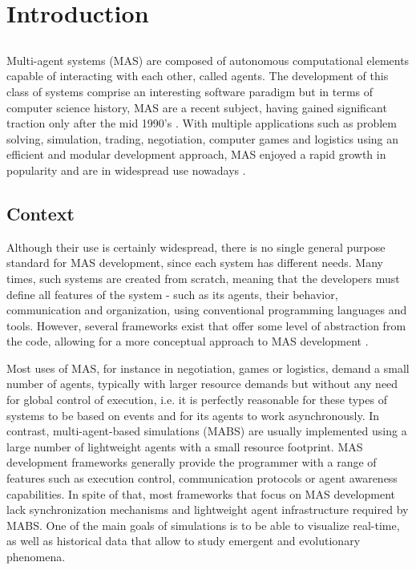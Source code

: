 \chapter{Introduction}
\label{chap:intro}

\section*{}

Multi-agent systems (MAS) are composed of autonomous computational elements capable of interacting with each other, called agents. The development of this class of systems comprise an interesting software paradigm but in terms of computer science history, MAS are a recent subject, having gained significant traction only after the mid 1990's \cite{wooldridge2008introduction}. With multiple applications such as problem solving, simulation, trading, negotiation, computer games and logistics using an efficient and modular development approach, MAS enjoyed a rapid growth in popularity and are in widespread use nowadays \cite{ferber1999multi}.

\section{Context}

Although their use is certainly widespread, there is no single general purpose standard for MAS development, since each system has different needs. Many times, such systems are created from scratch, meaning that the developers must define all features of the system - such as its agents, their behavior, communication and organization, using conventional programming languages and tools. However, several frameworks exist that offer some level of abstraction from the code, allowing for a more conceptual approach to
MAS development \cite{gormer2011jrep}. 

Most uses of MAS, for instance in negotiation, games or logistics, demand a small number of agents, typically with larger resource demands but without any need for global control of execution, i.e. it is perfectly reasonable for these types of systems to be based on events and for its agents to work asynchronously. In contrast, multi-agent-based simulations (MABS) are usually implemented using a large number of lightweight agents with a small resource footprint. MAS development frameworks generally provide the programmer with a range of features such as execution control, communication protocols or agent awareness capabilities. In spite of that, most frameworks that focus on MAS development lack synchronization mechanisms and lightweight agent infrastructure required by MABS. One of the main goals of simulations is to be able to visualize real-time, as well as historical data that allow to study emergent and evolutionary phenomena. \cite{mengistu2008scalability}


